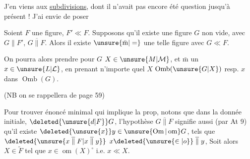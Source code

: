 
J'en viens aux  \uline{subdivisions}, dont il n'avait pas encore été question jusqu'à présent ! J'ai envie de poser

  \quad Soient $F$ une figure, $F'\ll F$. Supposons qu'il existe une figure $G$ non vide, avec $G\parallel F'$, $G\mathrel{\overline{\parallel}}F$. Alors il existe $\unsure{\bar{\text{m}}|=}$ une telle figure avec $G\ll F$.

 On pourra alors prendre pour $G$  $X\in\unsure{M|\mathcal M}$, et $\bar{\text{m}}$ un $x\in\unsure{L|\mathcal L}$,  en prenant n'importe quel $X$  $\operatorname{Omb}(\unsure{G|X})$ resp.  $x$ dans $\operatorname{Omb}(G)$.

(NB on se rappellera de  page 59)

Pour trouver  énoncé minimal qui implique la prop, notons que dans la donnée initiale, $\deleted{\unsure{d|F}}G$, l'hypothèse $G\mathrel{\overline{\parallel}}F$ signifie aussi (par At 9) qu'il existe $\deleted{\unsure{x}}y\in\unsure{\operatorname{Om}|\operatorname{om}}G$,  tels que $\deleted{\unsure{x\mathrel{\overline{\parallel}}F|x\mathrel{\overline{\parallel}}y}}$ $x\deleted{\unsure{\in|o}}\mathrel{\overline{\parallel}}y$,  Soit alors $X\in\widetilde F$ tel que $x\in\operatorname{om}(X)^{\circ}$ i.e. $x\ll X$.
